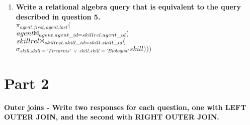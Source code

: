 \documentclass{article}
\begin{document}
\begin{enumerate}
\item
\textbf{Write a relational algebra query that is equivalent to the query described in question 5.\\}
$\pi_{agent.first,agent.last}($\\
$agent \Bowtie_{agent.agent\_id=skillrel.agent\_id} ($\\
$skillrel \Bowtie_{skillrel.skill\_id=skill.skill\_id} ($\\
$\sigma_{skill.skill='Firearms'\; \vee\; skill.skill='Biologist'}skill)))$\\

\end{enumerate}

\pagebreak

\section*{Part 2}
\textbf{Outer joins - Write two responses for each question, one with LEFT OUTER JOIN, and the
second with RIGHT OUTER JOIN.}
\end{document}
